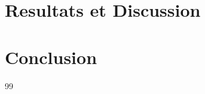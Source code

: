 \documentclass[12pt]{article}
\begin{document}
\section{Resultats et Discussion}



\section{Conclusion}



\begin{thebibliography}{99}


\end{thebibliography}
\end{document}
